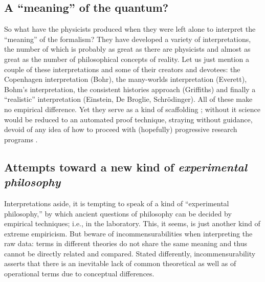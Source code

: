 \documentclass{article}
\begin{document}
\subsection{A ``meaning'' of the quantum?}

So what have the physicists produced when they
were left alone to interpret the ``meaning'' of the formalism?
They have developed a variety of interpretations,
the number of which is probably as great as there are physicists
and almost as great as the number of philosophical concepts of reality.
Let us just mention a couple of these interpretations and some of their creators and devotees:
{
the Copenhagen interpretation (Bohr),
the many-worlds interpretation  (Everett),
Bohm's interpretation,
the consistent histories approach (Griffiths) and finally a
``realistic'' interpretation  (Einstein, De Broglie, Schr\"odinger).}
All of these make no empirical difference.
Yet they serve as a kind of scaffolding \cite{svozil-2002-noiq};
without it science would be reduced to an automated proof technique,
straying without guidance,
devoid of any
idea of how to proceed with (hopefully) progressive research programs
\cite{lakatosch}.

\subsection{Attempts toward a new kind of {\em experimental philosophy}}

Interpretations aside,
it is tempting to speak of a kind of ``experimental philosophy,''
by which ancient questions of philosophy can be decided by empirical techniques;
i.e., in the laboratory.
This, it seems, is just another kind of extreme empiricism.
But beware of incommensurabilities when interpreting the raw data:
terms in different theories do not share the same meaning and thus cannot be directly related and compared.
Stated differently, incommensurability asserts
that there is an inevitable lack of  common theoretical as well as of operational
terms due to conceptual differences.
\end{document}
